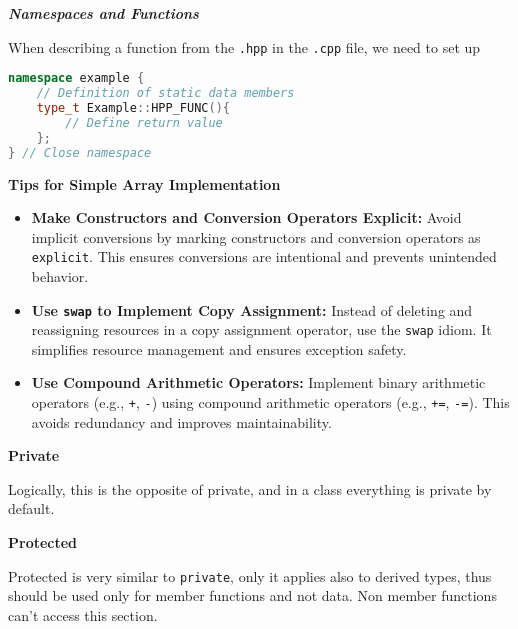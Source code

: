 \documentclass[fontsize=8pt, a4paper, landscape, fleqn]{scrartcl}
\renewcommand{\subsection}[1]{%
    \noindent\colorbox{subsectioncolor}{%
        \parbox{\dimexpr\columnwidth-2\fboxsep}{\color{white}\textbf{#1}}}%
    \vspace{0.5mm}%
}
\renewcommand{\subsubsection}[1]{%
    \noindent\textbf{\textit{\color{subsectioncolor}#1}}%
    \vspace{1mm}%
}
\begin{document}
\begin{multicols*}{3}[\raggedcolumns]
    \subsubsection{Namespaces and Functions}
    When describing a function from the \lstinline{.hpp} in the \lstinline{.cpp} file, we need to set up
    \begin{lstlisting}[language=C++, breaklines]
namespace example {
    // Definition of static data members
    type_t Example::HPP_FUNC(){
        // Define return value
    };
} // Close namespace \end{lstlisting}
\subsection{Tips for Simple Array Implementation}

\begin{itemize}
    \item \textbf{Make Constructors and Conversion Operators Explicit:}
    Avoid implicit conversions by marking constructors and conversion operators as \texttt{explicit}. This ensures conversions are intentional and prevents unintended behavior.

    \item \textbf{Use \texttt{swap} to Implement Copy Assignment:}
    Instead of deleting and reassigning resources in a copy assignment operator, use the \texttt{swap} idiom. It simplifies resource management and ensures exception safety.

    \item \textbf{Use Compound Arithmetic Operators:}
    Implement binary arithmetic operators (e.g., \texttt{+}, \texttt{-}) using compound arithmetic operators (e.g., \texttt{+=}, \texttt{-=}). This avoids redundancy and improves maintainability.

\end{itemize}
    \subsection{Private}
    Logically, this is the opposite of private, and in a class everything is private by default.
    
    \subsection{Protected} 
    Protected is very similar to \lstinline{private}, only it applies also to derived types, thus should be used only for member functions and not data. Non member functions can't access this section.


\end{multicols*}
\end{document}
